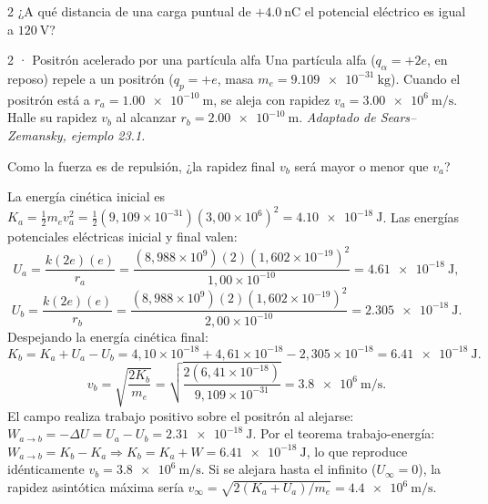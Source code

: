 \documentclass[11pt]{article}
\begin{document}
\begin{eReto}{2 }
¿A qué distancia de una carga puntual de $+\SI{4,0}{\nano\coulomb}$ el potencial eléctrico es igual a $\SI{120}{\volt}$?
\end{eReto}


\begin{eResuelto}{2 · Positrón acelerado por una partícula alfa}
Una partícula alfa ($q_\alpha=+2e$, en reposo) repele a un positrón ($q_p=+e$, masa $m_e=\SI{9,109e-31}{\kilogram}$). Cuando el positrón está a $r_a=\SI{1,00e-10}{\metre}$, se aleja con rapidez $v_a=\SI{3,00e6}{\metre\per\second}$. Halle su rapidez $v_b$ al alcanzar $r_b=\SI{2,00e-10}{\metre}$. \emph{Adaptado de Sears--Zemansky, ejemplo 23.1.}
\begin{center}
\end{center}
\begin{ePredice}Como la fuerza es de repulsión, ¿la rapidez final $v_b$ será mayor o menor que $v_a$?\end{ePredice}
La energía cinética inicial es $K_a=\frac{1}{2}m_ev_a^2=\frac{1}{2}(9{,}109\times10^{-31})(3{,}00\times10^6)^2=\SI{4,10e-18}{\joule}$.
Las energías potenciales eléctricas inicial y final valen:
\[ U_a=\frac{k(2e)(e)}{r_a}=\frac{(8{,}988\times10^9)(2)(1{,}602\times10^{-19})^2}{1{,}00\times10^{-10}}=\SI{4,61e-18}{\joule}, \]
\[ U_b=\frac{k(2e)(e)}{r_b}=\frac{(8{,}988\times10^9)(2)(1{,}602\times10^{-19})^2}{2{,}00\times10^{-10}}=\SI{2,305e-18}{\joule}. \]
Despejando la energía cinética final:
\[ K_b = K_a + U_a - U_b = 4{,}10\times10^{-18} + 4{,}61\times10^{-18} - 2{,}305\times10^{-18} = \SI{6,41e-18}{\joule}. \]
\[ v_b = \sqrt{\frac{2K_b}{m_e}} = \sqrt{\frac{2(6{,}41\times10^{-18})}{9{,}109\times10^{-31}}} = \SI{3,8e6}{\metre\per\second}. \]
El campo realiza trabajo positivo sobre el positrón al alejarse: $W_{a\to b}=-\Delta U = U_a-U_b = \SI{2,31e-18}{\joule}$.
Por el teorema trabajo-energía: $W_{a\to b}=K_b-K_a \Rightarrow K_b = K_a + W = \SI{6,41e-18}{\joule}$, lo que reproduce idénticamente $v_b=\SI{3,8e6}{\metre\per\second}$. Si se alejara hasta el infinito ($U_\infty=0$), la rapidez asintótica máxima sería $v_\infty=\sqrt{2(K_a+U_a)/m_e}=\SI{4,4e6}{\metre\per\second}$.
\end{eResuelto}
\end{document}
